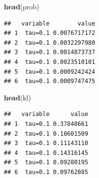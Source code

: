 \documentclass[11pt,a4paper,]{article}
\newenvironment{Shaded}{\begin{snugshade}}{\end{snugshade}}
\newcommand{\KeywordTok}[1]{\textcolor[rgb]{0.13,0.29,0.53}{\textbf{#1}}}
\newcommand{\DataTypeTok}[1]{\textcolor[rgb]{0.13,0.29,0.53}{#1}}
\newcommand{\DecValTok}[1]{\textcolor[rgb]{0.00,0.00,0.81}{#1}}
\newcommand{\FloatTok}[1]{\textcolor[rgb]{0.00,0.00,0.81}{#1}}
\newcommand{\StringTok}[1]{\textcolor[rgb]{0.31,0.60,0.02}{#1}}
\newcommand{\OtherTok}[1]{\textcolor[rgb]{0.56,0.35,0.01}{#1}}
\newcommand{\OperatorTok}[1]{\textcolor[rgb]{0.81,0.36,0.00}{\textbf{#1}}}
\newcommand{\NormalTok}[1]{#1}
\theoremstyle{definition}
\theoremstyle{definition}
\theoremstyle{remark}
\begin{document}
\begin{Shaded}
\end{Shaded}

\begin{Shaded}
\begin{Highlighting}[]
\KeywordTok{head}\NormalTok{(prob)}
\end{Highlighting}
\end{Shaded}

\begin{verbatim}
##   variable        value
## 1  tau=0.1 0.0076717172
## 2  tau=0.1 0.0032297980
## 3  tau=0.1 0.0014873737
## 4  tau=0.1 0.0023510101
## 5  tau=0.1 0.0009242424
## 6  tau=0.1 0.0009747475
\end{verbatim}

\begin{Shaded}
\begin{Highlighting}[]
\KeywordTok{head}\NormalTok{(kl)}
\end{Highlighting}
\end{Shaded}

\begin{verbatim}
##   variable      value
## 1  tau=0.1 0.37848661
## 2  tau=0.1 0.18601509
## 3  tau=0.1 0.11143110
## 4  tau=0.1 0.14316145
## 5  tau=0.1 0.09280195
## 6  tau=0.1 0.09762885
\end{verbatim}
\end{document}
